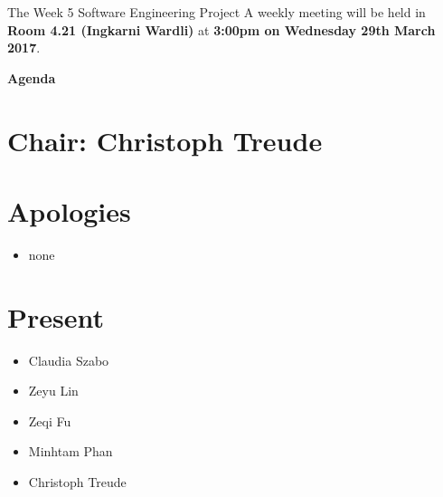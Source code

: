 \documentclass[11pt, a4paper]{article}
\begin{document}

\noindent The Week 5 Software Engineering Project A weekly meeting will be held in {\bf Room 4.21 (Ingkarni Wardli)} at {\bf 3:00pm on Wednesday 29th March 2017}.



\vspace*{15pt}

\begin{center}

\huge \bf Agenda

\end{center}




\section*{Chair: Christoph Treude  }

\vspace*{10pt}




\section{Apologies}

\begin{itemize}

\item none

\end{itemize}




\section{Present}

\begin{itemize}

\item Claudia Szabo

\item Zeyu Lin

\item Zeqi Fu

\item Minhtam Phan

\item Christoph Treude

\end{itemize}
\end{document}
